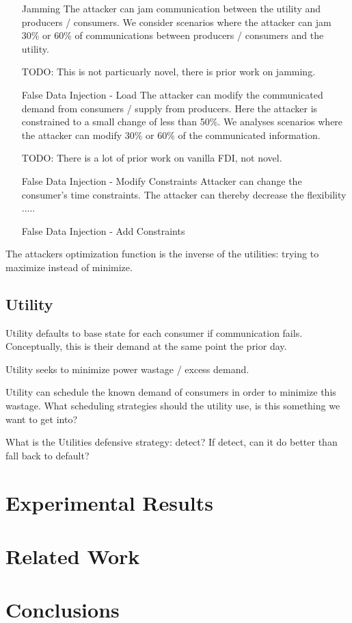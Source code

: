 \documentclass[conference]{IEEEtran}
\begin{document}
\begin{itemize}
\item [Jamming] The attacker can jam communication between the utility and producers / consumers.  We consider scenarios 
where the attacker can jam 30\% or 60\% of communications between producers / consumers and the utility.

TODO: This is not particuarly novel, there is prior work on jamming.  

\item [False Data Injection - Load] The attacker can modify the communicated demand from consumers / supply from producers.  
Here the attacker is constrained to a small change of less than 50\%.  We analyses scenarios where the attacker can modify
30\% or 60\% of the communicated information.

TODO: There is a lot of prior work on vanilla FDI, not novel.

\item [False Data Injection - Modify Constraints] Attacker can change the consumer's time constraints.  The attacker can
thereby decrease the flexibility .....

\item [False Data Injection - Add Constraints]
\end{itemize}

The attackers optimization function is the inverse of the utilities: trying to maximize instead of minimize.

\subsection{Utility}

Utility defaults to base state for each consumer if communication fails.  Conceptually, this is their demand at the same 
point the prior day.

Utility seeks to minimize power wastage / excess demand.

Utility can schedule the known demand of consumers in order to minimize this wastage.  What scheduling strategies
should the utility use, is this something we want to get into?

What is the Utilities defensive strategy: detect? If detect, can it do better than fall back to default?

\section{Experimental Results}
\section{Related Work}
\section{Conclusions}
\end{document}
